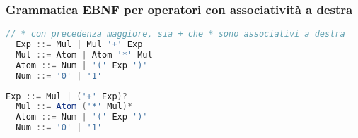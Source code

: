 \subsubsection{Grammatica EBNF per operatori con associatività a destra}
\begin{lstlisting}[language=Java, caption={Grammatica non ambigua}]
  // * con precedenza maggiore, sia + che * sono associativi a destra
  Exp ::= Mul | Mul '+' Exp
  Mul ::= Atom | Atom '*' Mul
  Atom ::= Num | '(' Exp ')'
  Num ::= '0' | '1'
\end{lstlisting}
\begin{lstlisting}[language=Java, caption={Grammatica EBNF equivalente}]
  Exp ::= Mul | ('+' Exp)?
  Mul ::= Atom ('*' Mul)*
  Atom ::= Num | '(' Exp ')'
  Num ::= '0' | '1'
\end{lstlisting}


